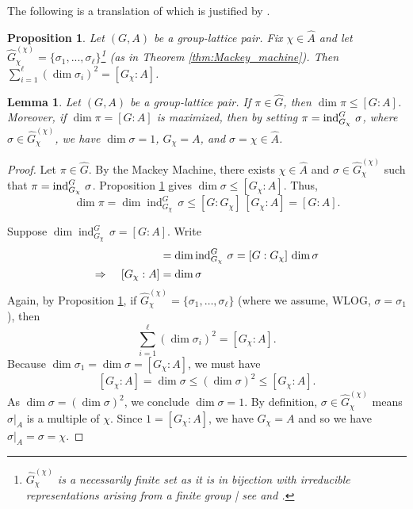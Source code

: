 \documentclass[11pt, twoside]{amsart}
\newcommand{\te}[1]{\operatorname{#1}}
\newcommand{\ds}{\displaystyle}
\newcommand{\wh}{\widehat}
\newtheorem{prop}[thm]{Proposition}
\newtheorem{lemma}[thm]{Lemma}
\theoremstyle{definition}
\begin{document}
The following is a translation of \cite[Cor~7.15(3)]{CST22} which is justified by \cite[Prop~3.22]{CW24}.

\begin{prop}\label{prop:sum_dim_fixed_char}
    Let $(G,A)$ be a group-lattice pair. Fix $\chi\in \wh{A}$ and let $\widehat{G}^{(\chi)}_{\chi}=\{\sigma_1,...,\sigma_{\ell}\}$\footnote{$\wh{G}_{\chi}^{(\chi)}$ is a necessarily finite set as it is in bijection with irreducible representations arising from a finite group | see \cite[Prop 7.12]{CST22} and \cite[Thm 3.16]{CW24}.} (as in Theorem \ref{thm:Mackey_machine}). Then $\ds\sum_{i=1}^{\ell}(\dim\sigma_i)^2=[G_{\chi}:A]$.
\end{prop}


\begin{lemma}\label{lemma:dim_argument}
Let $(G,A)$ be a group-lattice pair. If $\pi\in\wh{G}$, then $\dim \pi\leq [G:A]$. Moreover, if $\dim\pi=[G:A]$ is maximized, then by setting $\pi=\te{\normalfont{ind}}_{G_{\chi}}^G\,\sigma$, where $\sigma\in\wh{G}_{\chi}^{(\chi)}$, we have $\dim\sigma=1$, $G_\chi=A$, and $\sigma=\chi\in\wh{A}$.

\end{lemma}

\begin{proof}
Let $\pi\in\wh{G}$. By the Mackey Machine, there exists $\chi\in\wh{A}$ and $\sigma\in\wh{G}_{\chi}^{(\chi)}$ such that $\pi=\te{\normalfont{ind}}_{G_{\chi}}^G\,\sigma$. Proposition \ref{prop:sum_dim_fixed_char} gives $\dim \sigma\leq [G_{\chi}:A]$. Thus, 
\[\dim \pi=\dim\te{ind}_{G_{\chi}}^G\,\sigma\leq [G:G_{\chi}]\,[G_{\chi}:A]=[G:A].\]

Suppose $\dim\te{ind}_{G_{\chi}}^G\,\sigma=[G:A]$.  Write
\begin{align*}
[G:A]&=\dim\te{ind}_{G_{\chi}}^G\,\sigma=[G:G_{\chi}]\,\dim\sigma\\
\Rightarrow \hspace{.15in} [G_{\chi}:A]&=\dim\sigma
\end{align*}
Again, by Proposition \ref{prop:sum_dim_fixed_char}, if $\wh{G}_{\chi}^{(\chi)}=\{\sigma_1,\dots,\sigma_{\ell}\}$ (where we assume, WLOG, $\sigma=\sigma_1$), then 
\[\sum_{i=1}^{\ell}(\dim \sigma_i)^2=[G_{\chi}:A].\]
Because $\dim\sigma_1=\dim\sigma=[G_{\chi}:A]$, we must have
\[[G_{\chi}:A]=\dim\sigma\leq(\dim \sigma)^2\leq [G_{\chi}:A].\]
As $\dim\sigma=(\dim\sigma)^2$, we conclude $\dim\sigma=1$. By definition, $\sigma\in \wh{G}_{\chi}^{(\chi)}$ means $\sigma|_A$ is a multiple of $\chi$. Since $1=[G_{\chi}:A]$, we have $G_{\chi}=A$ and so we have $\sigma|_A=\sigma=\chi$.
\end{proof}
\end{document}
